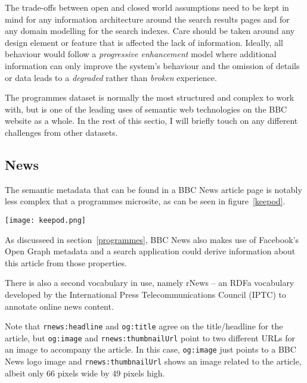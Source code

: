 The trade-offs between open and closed world assumptions need to
be kept in mind for any information architecture around the
search results pages and for any domain modelling for the
search indexes. Care should be taken around any design element
or feature that is affected the lack of information. Ideally,
all behaviour would follow a \emph{progressive enhancement} model
where additional information can only improve the system's
behaviour
and the omission of details or data leads to a \emph{degraded}
rather than \emph{broken} experience.

The programmes dataset is normally the most structured and
complex to work with, but is one of the leading uses of
semantic web technologies on the BBC website as a whole. In
the rest of this sectio, I will briefly touch on any different
challenges from other datasets.

\subsection{News}

The semantic metadata that can be found in a BBC News article
page is notably less complex that a programmes microsite, as
can be seen in figure~\ref{keepod}.

\begin{sidewaysfigure}
  \begin{center}
    \texttt{[image: keepod.png]}
  \end{center}
  \caption{Metadata found within a BBC News article page}
  \label{keepod}
\end{sidewaysfigure}

As discusseed in section~\ref{programmes}, BBC News also makes
use of Facebook's Open Graph metadata and a search application
could derive information about this article from those properties.

There is also a second vocabulary in use, namely rNews -- an RDFa
vocabulary developed by the International Press Telecommunications Council
(IPTC) to annotate online news content.

Note that \texttt{rnews:headline} and \texttt{og:title} agree on
the title/headline for the article, but \texttt{og:image} and
\texttt{rnews:thumbnailUrl} point to two different URLs for
an image to accompany the article. In this case, \texttt{og:image}
just points to a BBC News logo image and \texttt{rnews:thumbnailUrl}
shows an image related to the article, albeit only 66 pixels wide
by 49 pixels high.

